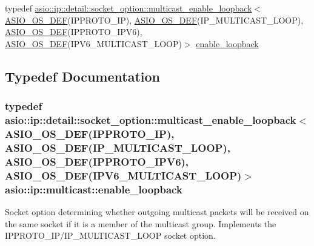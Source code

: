 \begin{DoxyCompactItemize}
typedef \hyperlink{classasio_1_1ip_1_1detail_1_1socket__option_1_1multicast__enable__loopback}{asio\+::ip\+::detail\+::socket\+\_\+option\+::multicast\+\_\+enable\+\_\+loopback}$<$ \hyperlink{socket__types_8hpp_a26e0208fa086ac48cf5af1b2a521c74a}{A\+S\+I\+O\+\_\+\+O\+S\+\_\+\+D\+E\+F}(I\+P\+P\+R\+O\+T\+O\+\_\+\+I\+P), \hyperlink{socket__types_8hpp_a26e0208fa086ac48cf5af1b2a521c74a}{A\+S\+I\+O\+\_\+\+O\+S\+\_\+\+D\+E\+F}(I\+P\+\_\+\+M\+U\+L\+T\+I\+C\+A\+S\+T\+\_\+\+L\+O\+O\+P), \hyperlink{socket__types_8hpp_a26e0208fa086ac48cf5af1b2a521c74a}{A\+S\+I\+O\+\_\+\+O\+S\+\_\+\+D\+E\+F}(I\+P\+P\+R\+O\+T\+O\+\_\+\+I\+P\+V6), \hyperlink{socket__types_8hpp_a26e0208fa086ac48cf5af1b2a521c74a}{A\+S\+I\+O\+\_\+\+O\+S\+\_\+\+D\+E\+F}(I\+P\+V6\+\_\+\+M\+U\+L\+T\+I\+C\+A\+S\+T\+\_\+\+L\+O\+O\+P)$>$ \hyperlink{namespaceasio_1_1ip_1_1multicast_a6a21cc875fbfac80d2049c95bc7dfe6b}{enable\+\_\+loopback}
\end{DoxyCompactItemize}


\subsection{Typedef Documentation}
\hypertarget{namespaceasio_1_1ip_1_1multicast_a6a21cc875fbfac80d2049c95bc7dfe6b}{}
\subsubsection[{enable\+\_\+loopback}]{\setlength{\rightskip}{0pt plus 5cm}typedef {\bf asio\+::ip\+::detail\+::socket\+\_\+option\+::multicast\+\_\+enable\+\_\+loopback}$<$ {\bf A\+S\+I\+O\+\_\+\+O\+S\+\_\+\+D\+E\+F}(I\+P\+P\+R\+O\+T\+O\+\_\+\+I\+P), {\bf A\+S\+I\+O\+\_\+\+O\+S\+\_\+\+D\+E\+F}(I\+P\+\_\+\+M\+U\+L\+T\+I\+C\+A\+S\+T\+\_\+\+L\+O\+O\+P), {\bf A\+S\+I\+O\+\_\+\+O\+S\+\_\+\+D\+E\+F}(I\+P\+P\+R\+O\+T\+O\+\_\+\+I\+P\+V6), {\bf A\+S\+I\+O\+\_\+\+O\+S\+\_\+\+D\+E\+F}(I\+P\+V6\+\_\+\+M\+U\+L\+T\+I\+C\+A\+S\+T\+\_\+\+L\+O\+O\+P)$>$ {\bf asio\+::ip\+::multicast\+::enable\+\_\+loopback}}\label{namespaceasio_1_1ip_1_1multicast_a6a21cc875fbfac80d2049c95bc7dfe6b}
Socket option determining whether outgoing multicast packets will be received on the same socket if it is a member of the multicast group. Implements the I\+P\+P\+R\+O\+T\+O\+\_\+\+I\+P/\+I\+P\+\_\+\+M\+U\+L\+T\+I\+C\+A\+S\+T\+\_\+\+L\+O\+O\+P socket option.


